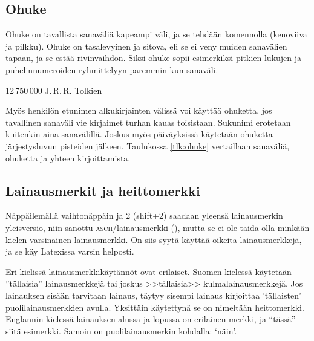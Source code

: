 \subsection{Ohuke}

Ohuke on tavallista sanaväliä kapeampi väli, ja se tehdään komennolla
\koodi{\keno,} (kenoviiva ja pilkku). Ohuke on tasalevyinen ja sitova,
eli se ei veny muiden sanavälien tapaan, ja se estää rivinvaihdon. Siksi
ohuke sopii esimerkiksi pitkien lukujen ja puhelinnumeroiden
ryhmittelyyn paremmin kun sanaväli.

\begin{koodilohkosis}
  12\,750\,000
  J.\,R.\,R. Tolkien
\end{koodilohkosis}

Myös henkilön etunimen alkukirjainten välissä voi käyttää ohuketta, jos
tavallinen sanaväli vie kirjaimet turhan kauas toisistaan. Sukunimi
erotetaan kuitenkin aina sanavälillä. Joskus myös päiväyksissä käytetään
ohuketta järjestysluvun pisteiden jälkeen. Taulukossa \ref{tlk:ohuke}
vertaillaan sanaväliä, ohuketta ja yhteen kirjoittamista.


\subsection{Lainausmerkit ja heittomerkki}

Näppäilemällä vaihtonäppäin ja 2 (shift+2) saadaan yleensä lainausmerkin
yleisversio, niin sanottu \textsc{ascii}\-/lainausmerkki
(\textquotedbl), mutta se ei ole taida olla minkään kielen varsinainen
lainausmerkki. On siis syytä käyttää oikeita lainausmerkkejä, ja se käy
Latexissa varsin helposti.

Eri kielissä lainausmerkkikäytännöt ovat erilaiset. Suomen kielessä
käytetään ''tällaisia'' lainausmerkkejä tai joskus >>tällaisia>>
kulmalainausmerkkejä. Jos lainauksen sisään tarvitaan lainaus, täytyy
sisempi lainaus kirjoittaa 'tällaisten' puolilainausmerkkien avulla.
Yksittäin käytettynä se on nimeltään heittomerkki. Englannin kielessä
lainauksen alussa ja lopussa on erilainen merkki, ja ``tässä'' siitä
esimerkki. Samoin on puolilainausmerkin kohdalla: `näin'.

